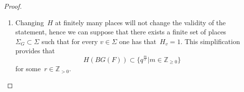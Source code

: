 \documentclass[a4paper,english,12pt]{amsart}
\newcommand{\CC}{\mathbb{C}}
\newcommand{\oF}{\overline F}
\newcommand{\ZZ}{\mathbb{Z}}
\newcommand{\vMF}{v\in M_F}
\newcommand{\AAA}{\mathbb A}
\newcommand{\wH}{\widehat H}
\numberwithin{equation}{subsection}
\begin{document}
\begin{proof}
\begin{enumerate}
\begin{align*}
\{x\in BG(F)|H(x)\leq \epsilon\mathbf 1_{V}B\}&\subset\{x\in BG(F)| H(x)\leq f(x)B\}\\&\subset \{x\in BG(F)|  H(x)\leq  CB\}.
\end{align*}
It follows thus to prove the statement for the characteristic function~$f=\mathbf 1_U$ of elementary open sets~$U$.
\item %
Changing~$H$ at finitely many places will not change the validity of the statement, hence we can suppose that there exists a finite set of places $\Sigma_G\subset\Sigma$ such that for every $v\in\Sigma$ one has that~$H_v=1$. %
This simplification provides that %
$$H(BG(F))\subset \{q^{\frac mr}|m\in\ZZ_{\geq 0}\}$$ for some~$r\in\ZZ_{>0}$.  

\end{enumerate}
\end{proof}
\end{document}

